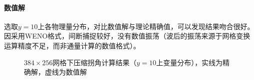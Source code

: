 \documentclass[11pt]{article}
\begin{document}
\paragraph{数值解} 选取$y=10$上各物理量分布，对比数值解与理论精确值，可以发现结果吻合很好。因采用WENO格式，间断捕捉较好，没有数值振荡（波后的振荡来源于网格变换运算精度不足，而非通量计算的数值格式）。

\begin{figure}[htbp]
	\centering
	\caption{\label{fig:ramp256line}$384\times256$网格下压缩拐角计算结果（$y=10$上变量分布），实线为精确解，虚线为数值解}
\end{figure}
\end{document}
